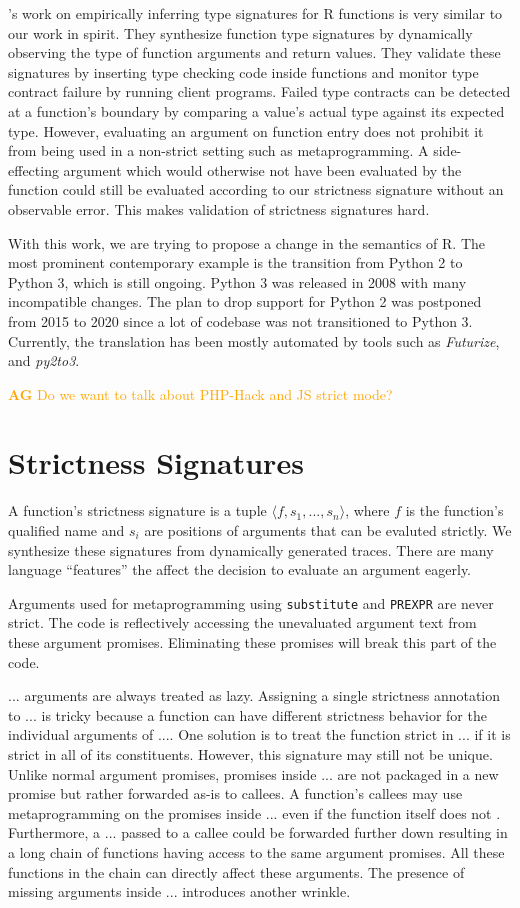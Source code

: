 \documentclass[review,nonacm,screen,acmsmall,anonymous=true]{acmart}
\newcommand{\authorcomment}[3]{\xspace\textcolor{#1}{{\bf #2} #3}\xspace} %
\newcommand{\AG}[1]{\authorcomment{orange}{AG}{#1}}
\newcommand{\code}[1]{\lstinline[style=R]|#1|\xspace}
\begin{document}
\cite{oopsla20b}'s work on empirically inferring type signatures for R functions
is very similar to our work in spirit. They synthesize function type signatures
by dynamically observing the type of function arguments and return values. They
validate these signatures by inserting type checking code inside functions and
monitor type contract failure by running client programs. Failed type contracts
can be detected at a function's boundary by comparing a value's actual type
against its expected type. However, evaluating an argument on function entry
does not prohibit it from being used in a non-strict setting such as
metaprogramming. A side-effecting argument which would otherwise not have been
evaluated by the function could still be evaluated according to our strictness
signature without an observable error. This makes validation of strictness
signatures hard.

With this work, we are trying to propose a change in the semantics of R. The
most prominent contemporary example is the transition from Python 2 to Python 3,
which is still ongoing. Python 3 was released in 2008 with many incompatible
changes. The plan \cite{pysunset} to drop support for Python 2 was postponed
from 2015 to 2020 since a lot of codebase was not transitioned to Python 3.
Currently, the translation has been mostly automated by tools such as
\emph{Futurize}, and \emph{py2to3}.

\AG{Do we want to talk about PHP-Hack and JS strict mode?}

\section{Strictness Signatures}

A function's strictness signature is a tuple $\langle f, s_1, ..., s_n \rangle$,
where $f$ is the function's qualified name and $s_i$ are positions of arguments
that can be evaluted strictly. We synthesize these signatures from dynamically
generated traces. There are many language ``features'' the affect the decision
to evaluate an argument eagerly.

Arguments used for metaprogramming using \code{substitute} and \code{PREXPR} are
never strict. The code is reflectively accessing the unevaluated argument text
from these argument promises. Eliminating these promises will break this part of
the code.

$...$ arguments are always treated as lazy. Assigning a single strictness
annotation to $...$ is tricky because a function can have different strictness
behavior for the individual arguments of $...$. One solution is to treat the
function strict in $...$ if it is strict in all of its constituents. However,
this signature may still not be unique. Unlike normal argument promises,
promises inside $...$ are not packaged in a new promise but rather forwarded
as-is to callees. A function's callees may use metaprogramming on the promises
inside $...$ even if the function itself does not . Furthermore, a $...$ passed
to a callee could be forwarded further down resulting in a long chain of
functions having access to the same argument promises. All these functions in
the chain can directly affect these arguments. The presence of missing arguments
inside $...$ introduces another wrinkle.
\end{document}
